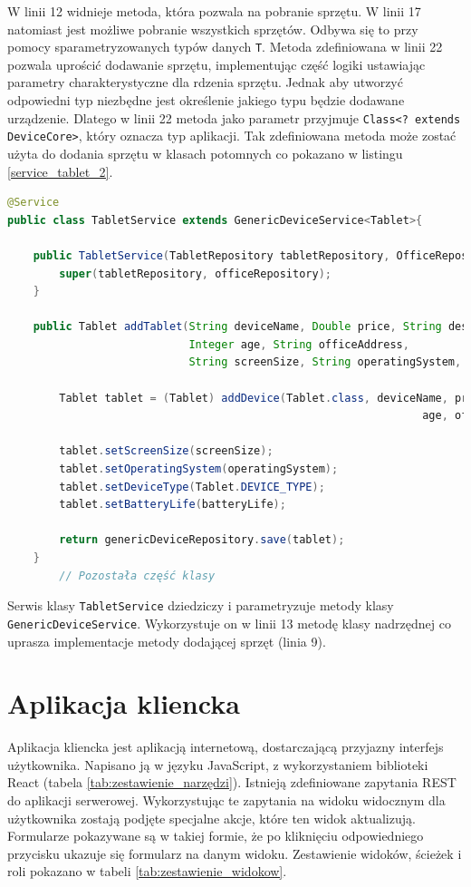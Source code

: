 W linii 12 widnieje metoda, która pozwala na pobranie sprzętu. W linii 17 natomiast jest możliwe pobranie wszystkich sprzętów. Odbywa się to przy pomocy sparametryzowanych typów danych \texttt{T}. Metoda zdefiniowana w linii 22 pozwala uprościć dodawanie sprzętu, implementując część logiki ustawiając parametry charakterystyczne dla rdzenia sprzętu. Jednak aby utworzyć odpowiedni typ niezbędne jest określenie jakiego typu będzie dodawane urządzenie. Dlatego w linii 22 metoda jako parametr przyjmuje \texttt{Class<? extends DeviceCore>}, który oznacza typ aplikacji. Tak zdefiniowana metoda może zostać użyta do dodania sprzętu w klasach potomnych co pokazano w listingu \ref{service_tablet_2}.

\begin{lstlisting}[language=Java, style=JavaStyle,  caption={Klasa potomna serwisu tabletu: TabletService }, label={service_tablet_2}]
@Service
public class TabletService extends GenericDeviceService<Tablet>{

    public TabletService(TabletRepository tabletRepository, OfficeRepository officeRepository){
        super(tabletRepository, officeRepository);
    }

    public Tablet addTablet(String deviceName, Double price, String description,
                            Integer age, String officeAddress,
                            String screenSize, String operatingSystem, String batteryLife){

        Tablet tablet = (Tablet) addDevice(Tablet.class, deviceName, price, description,
                                                                age, officeAddress);

        tablet.setScreenSize(screenSize);
        tablet.setOperatingSystem(operatingSystem);
        tablet.setDeviceType(Tablet.DEVICE_TYPE);
        tablet.setBatteryLife(batteryLife);

        return genericDeviceRepository.save(tablet);
    }
		// Pozostała część klasy
\end{lstlisting}

Serwis klasy \texttt{TabletService} dziedziczy i parametryzuje metody klasy \texttt{GenericDeviceService}. Wykorzystuje on w linii 13 metodę klasy nadrzędnej co uprasza implementacje metody dodającej sprzęt (linia 9).

\section {Aplikacja kliencka}
Aplikacja kliencka jest aplikacją internetową, dostarczającą przyjazny interfejs użytkownika. Napisano ją w języku JavaScript, z wykorzystaniem biblioteki React (tabela \ref{tab:zestawienie_narzędzi}). Istnieją zdefiniowane zapytania REST do aplikacji serwerowej. Wykorzystując te zapytania na widoku widocznym dla użytkownika zostają podjęte specjalne akcje, które ten widok aktualizują. Formularze pokazywane są w takiej formie, że po kliknięciu odpowiedniego przycisku ukazuje się formularz na danym widoku. Zestawienie widoków, ścieżek i roli pokazano w tabeli \ref{tab:zestawienie_widokow}.

